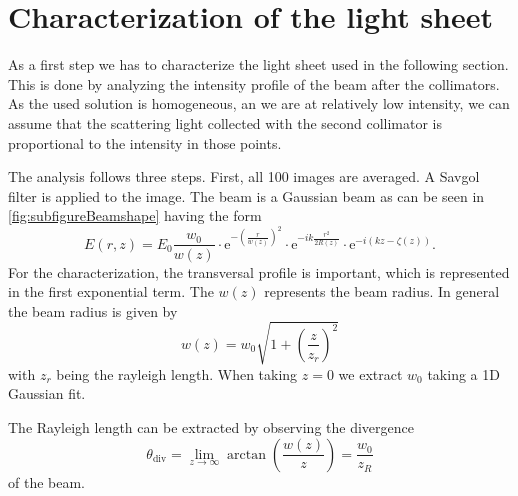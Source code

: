 \section{Characterization of the light sheet}
\label{sec:LightSheet}

As a first step we has to characterize the light sheet used in the following section. This is done by analyzing the intensity profile 
of the beam after the collimators. As the used solution is homogeneous, an we are at relatively low intensity, we can 
assume that the scattering light collected with the second collimator is proportional to the intensity in those points.

The analysis follows three steps. First, all 100 images are averaged. A Savgol filter is applied to the image.
The beam is a Gaussian beam as can be seen in \cref{fig:subfigureBeamshape} having the form
\begin{equation}
    E(r, z)=E_0 \frac{w_0}{w(z)} \cdot \mathrm{e}^{-\left(\frac{r}{w(z)}\right)^2} \cdot \mathrm{e}^{-i k \frac{r^2}{2 R(z)}} \cdot \mathrm{e}^{-i(k z-\zeta(z))}.
\end{equation}
For the characterization, the transversal profile is important, which is represented in the first exponential term. The $w(z)$ represents the beam radius. 
In general the beam radius is given by 
\begin{equation}
    w(z) = w_0 \sqrt{1+\left(\frac{z}{z_r}\right)^2}
\end{equation} 
with $z_r$ being the rayleigh length. When taking $z=0$ we extract $w_0$ taking a 1D Gaussian fit.

The Rayleigh length can be extracted by observing the divergence 
\begin{equation}
    \theta_{\mathrm{div}} = \lim_{z \to \infty} \arctan\left(\frac{w(z)}{z}\right) = \frac{w_0}{z_R}
\end{equation}
of the beam. 


